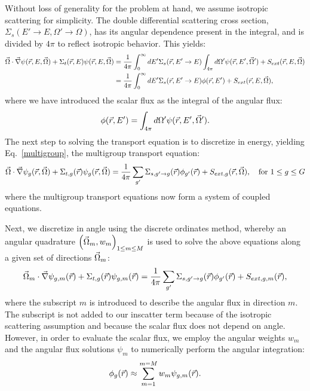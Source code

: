 Without loss of generality for the problem at hand, we assume isotropic scattering for simplicity. The double differential scattering cross section, $\Sigma_s(E'\to E, \Omega'\to\Omega)$, has its angular dependence present in the integral, and is divided by $4\pi$ to reflect isotropic behavior. This yields:
\begin{align}
\label{isotropic}
\vec{\Omega} \cdot \vec \nabla \psi(\vec{r},E,\vec{\Omega}) +\Sigma_t(\vec{r},E) \psi(\vec{r},E,\vec{\Omega})  
& = \frac{1}{4\pi}\int_{0}^{\infty}dE' \Sigma_s(\vec{r},E'\to E) \int_{4\pi}d\Omega' \psi(\vec{r},E',\vec{\Omega}')  + S_{ext}(\vec{r},E,\vec{\Omega}) \nonumber \\
& = \frac{1}{4\pi}\int_{0}^{\infty}dE' \Sigma_s(\vec{r},E'\to E) \phi(\vec{r},E')  + S_{ext}(\vec{r},E,\vec{\Omega}) ,
\end{align}
where we have introduced the scalar flux as the integral of the angular flux:
\begin{equation}
\label{def_scalar_flux}
\phi(\vec{r},E') = \int_{4\pi}d\Omega' \psi(\vec{r},E',\vec{\Omega}').
\end{equation}
The next step to solving the transport equation is to discretize in energy, yielding Eq.~\eqref{multigroup}, the multigroup transport equation:
\begin{equation}
\vec{\Omega} \cdot \vec \nabla \psi_g(\vec{r},\vec{\Omega}) +\Sigma_{t,g}(\vec{r}) \psi_g(\vec{r},\vec{\Omega}) = \frac{1}{4\pi}\sum_{g^{\prime}}\Sigma_{s,g^{\prime}\to g}(\vec{r})\phi_{g^{\prime}}(\vec{r}) + S_{ext,g}(\vec{r},\vec{\Omega}), \quad \text{for } 1 \le g \le G
\label{multigroup}
\end{equation}
where the multigroup transport equations now form a system of coupled equations. 

Next, we discretize in angle using the discrete ordinates method\cite{denovo}, whereby an angular quadrature $\left( \vec{\Omega}_m, w_m \right)_{1 \le m \le M}$ is used to solve the above equations along a given set of directions $\vec{\Omega}_m$:
\begin{equation}
\vec{\Omega}_m \cdot \vec \nabla \psi_{g,m}(\vec{r}) +\Sigma_{t,g}(\vec{r}) \psi_{g,m}(\vec{r})  = \frac{1}{4\pi}\sum_{g^{\prime}}\Sigma_{s,g^{\prime}\to g}(\vec{r})\phi_{g^{\prime}}(\vec{r}) + S_{ext,g,m}(\vec{r}),
\label{angle}
\end{equation}
where the subscript $m$ is introduced to describe the angular flux in direction $m$. The subscript is not added to our inscatter term because of the isotropic scattering assumption and because the scalar flux does not depend on angle. However, in order to evaluate the scalar flux, we employ the angular weights $w_m$ and the angular flux solutions
$\psi_m$ to numerically perform the angular integration:
\begin{equation}
\label{def_scalar_flux_2}
\phi_g(\vec{r}) \approx \sum_{m=1}^{m=M} w_m \psi_{g,m}(\vec{r}).
\end{equation}


